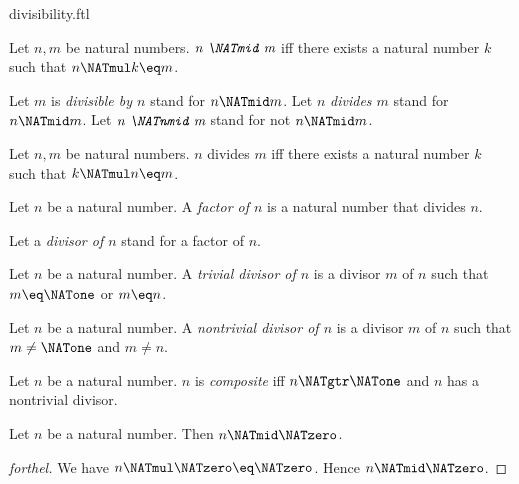 \documentclass{stex}
\begin{document}
\begin{smodule}{divisibility.ftl}

\begin{definition}[forthel,id=ARITHMETIC_07_4239998993825792]
  Let $n, m$ be natural numbers.
  $\emph{n \NATmid m}$ iff there exists a natural number $k$ such that $n \NATmul k \eq m$.

  Let $m$ is \emph{divisible by $n$} stand for $n \NATmid m$.
  Let $n$ \emph{divides $m$} stand for $n \NATmid m$.
  Let $\emph{n \NATnmid m}$ stand for not $n \NATmid m$.
\end{definition}

\begin{lemma}[forthel,id=ARITHMETIC_07_1478855118290944]
  Let $n, m$ be natural numbers.
  $n$ divides $m$ iff there exists a natural number $k$ such that $k \NATmul n \eq m$.
\end{lemma}

\begin{definition}[forthel,id=ARITHMETIC_07_1311437490225152]
  Let $n$ be a natural number.
  A \emph{factor of $n$} is a natural number that divides $n$.

  Let a \emph{divisor of $n$} stand for a factor of $n$.
\end{definition}

\begin{definition}[forthel,id=ARITHMETIC_10_5438991513944064]
  Let $n$ be a natural number.
  A \emph{trivial divisor of $n$} is a divisor $m$ of $n$ such that $m \eq \NATone$ or $m \eq n$.
\end{definition}

\begin{definition}[forthel,id=ARITHMETIC_10_8768240253665280]
  Let $n$ be a natural number.
  A \emph{nontrivial divisor of $n$} is a divisor $m$ of $n$ such that $m \neq \NATone$ and $m \neq n$.
\end{definition}

\begin{definition}[forthel,id=ARITHMETIC_10_8020087063707648]
  Let $n$ be a natural number.
  $n$ is \emph{composite} iff $n \NATgtr \NATone$ and $n$ has a nontrivial divisor.
\end{definition}

\begin{proposition}[forthel,id=ARITHMETIC_07_2242720387039232]
  Let $n$ be a natural number.
  Then $n \NATmid \NATzero$.
\end{proposition}
\begin{proof}[forthel]
  We have $n \NATmul \NATzero \eq \NATzero$.
  Hence $n \NATmid \NATzero$.
\end{proof}


\end{smodule}
\end{document}
